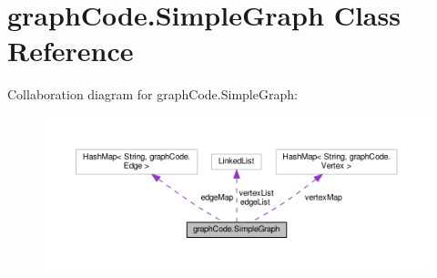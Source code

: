\hypertarget{classgraphCode_1_1SimpleGraph}{}\section{graph\+Code.\+Simple\+Graph Class Reference}
\label{classgraphCode_1_1SimpleGraph}


Collaboration diagram for graph\+Code.\+Simple\+Graph\+:\nopagebreak
\begin{figure}[H]
\begin{center}
\leavevmode
\includegraphics[width=350pt]{classgraphCode_1_1SimpleGraph__coll__graph}
\end{center}
\end{figure}
